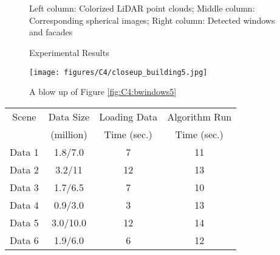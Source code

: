 \begin{figure}[H]
\hspace{.1in}
\hspace{.1in}
 \\

\hspace{.1in}
\hspace{.1in}
 \\

\caption{Experimental Results} 
\label{fig:C4:detectedWindows} {Left column: Colorized LiDAR point clouds; Middle column: Corresponding spherical images; Right column: Detected windows and facades}
\end{figure}

\begin{figure}[h]
\centering
\texttt{[image: figures/C4/closeup\_building5.jpg]} 

\caption{A blow up of Figure \ref{fig:C4:bwindows5}} 
\label{fig:C4:closeup}
\end{figure}

\begin{table}
\centering
{}
\begin{tabular}{|c|c|c|c|}
\hline
Scene & Data Size & Loading Data   & Algorithm Run \\
& (million) & Time (sec.) & Time  (sec.)\\
\hline
Data 1 &  1.8/7.0 & 7 & 11 \\
\hline
Data  2 &  3.2/11 & 12 & 13 \\
\hline
Data  3 &  1.7/6.5 & 7 & 10 \\
\hline
Data  4 &  0.9/3.0 & 3 & 13 \\
\hline
Data 5 &  3.0/10.0 & 12 & 14 \\
\hline
Data  6 &  1.9/6.0 & 6 & 12 \\
\hline

\end{tabular}
\label{table:C4:PE1}
\end{table}

